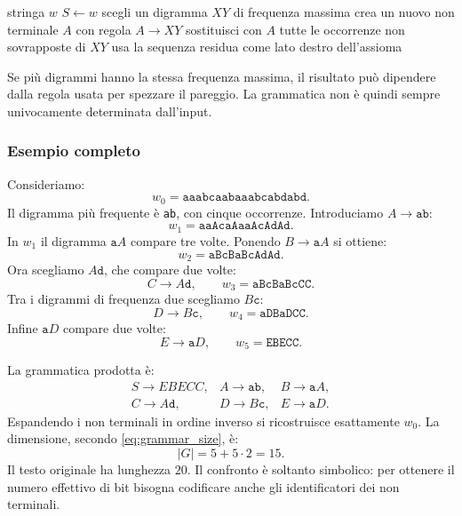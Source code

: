 \documentclass{article}
\theoremstyle{definition}
\numberwithin{equation}{section}
\begin{document}
\begin{algorithm}[H]
    \caption{Schema di Re-Pair}
    \begin{algorithmic}[1]
        \Require stringa $w$
        \State $S\gets w$
        \State scegli un digramma $XY$ di frequenza massima
        \State crea un nuovo non terminale $A$ con regola $A\to XY$
        \State sostituisci con $A$ tutte le occorrenze non sovrapposte di $XY$
        \EndWhile
        \State usa la sequenza residua come lato destro dell'assioma
    \end{algorithmic}
    \label{alg:repair}
\end{algorithm}

Se più digrammi hanno la stessa frequenza massima, il risultato può dipendere
dalla regola usata per spezzare il pareggio. La grammatica non è quindi sempre
univocamente determinata dall'input.

\subsubsection{Esempio completo}
Consideriamo:
\[
    w_0=\texttt{aaabcaabaaabcabdabd}.
\]
Il digramma più frequente è \texttt{ab}, con cinque occorrenze. Introduciamo
$A\to\texttt{ab}$:
\[
    w_1=\texttt{aaAcaAaaAcAdAd}.
\]
In $w_1$ il digramma $\texttt{a}A$ compare tre volte. Ponendo
$B\to\texttt{a}A$ si ottiene:
\[
    w_2=\texttt{aBcBaBcAdAd}.
\]
Ora scegliamo $A\texttt{d}$, che compare due volte:
\[
    C\to A\texttt{d},
    \qquad
    w_3=\texttt{aBcBaBcCC}.
\]
Tra i digrammi di frequenza due scegliamo $B\texttt{c}$:
\[
    D\to B\texttt{c},
    \qquad
    w_4=\texttt{aDBaDCC}.
\]
Infine $\texttt{a}D$ compare due volte:
\[
    E\to\texttt{a}D,
    \qquad
    w_5=\texttt{EBECC}.
\]

La grammatica prodotta è:
\[
    \begin{array}{lll}
        S\to EBECC,
         & A\to\texttt{ab},
         & B\to\texttt{a}A,  \\
        C\to A\texttt{d},
         & D\to B\texttt{c},
         & E\to\texttt{a}D.
    \end{array}
\]
Espandendo i non terminali in ordine inverso si ricostruisce esattamente
$w_0$. La dimensione, secondo \eqref{eq:grammar_size}, è:
\[
    |G|=5+5\cdot 2=15.
\]
Il testo originale ha lunghezza $20$. Il confronto è soltanto simbolico: per
ottenere il numero effettivo di bit bisogna codificare anche gli identificatori
dei non terminali.
\end{document}
